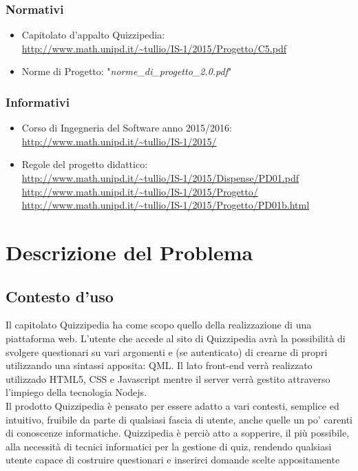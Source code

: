 \documentclass[a4paper,11pt]{article}
\begin{document}
		\subsubsection{Normativi}
		\begin{itemize}
			\item Capitolato d'appalto Quizzipedia:\\
			\url{http://www.math.unipd.it/~tullio/IS-1/2015/Progetto/C5.pdf}
			\item Norme di Progetto: "\textit{norme\_di\_progetto\_2.0.pdf}"
		\end{itemize}
		\subsubsection{Informativi}
		\begin{itemize}
			\item Corso di Ingegneria del Software anno 2015/2016:\\
			\url{http://www.math.unipd.it/~tullio/IS-1/2015/}
			\item Regole del progetto didattico:\\
			\url{http://www.math.unipd.it/~tullio/IS-1/2015/Dispense/PD01.pdf}
			\url{http://www.math.unipd.it/~tullio/IS-1/2015/Progetto/}\\
			\url{http://www.math.unipd.it/~tullio/IS-1/2015/Progetto/PD01b.html}
		\end{itemize}
	\pagebreak

	\newpage	
	\section{Descrizione del Problema}
	\subsection{Contesto d'uso}
		Il capitolato Quizzipedia ha come scopo quello della realizzazione di una piattaforma web. L'utente che accede al sito di Quizzipedia avrà la possibilità di svolgere questionari su vari argomenti e (se autenticato) di crearne di propri utilizzando una sintassi apposita: QML. Il lato front-end verrà realizzato utilizzado HTML5, CSS e Javascript mentre il server verrà gestito attraverso l'impiego della tecnologia Nodejs.\\
		Il prodotto Quizzipedia è pensato per essere adatto a vari contesti, semplice ed intuitivo, fruibile da parte di qualsiasi fascia di utente, anche quelle un po' carenti di conoscenze informatiche. Quizzipedia è perciò atto a sopperire, il più possibile, alla necessità di tecnici informatici per la gestione di quiz, rendendo qualsiasi utente capace di costruire questionari e inserirci domande scelte appositamente
\end{document}
